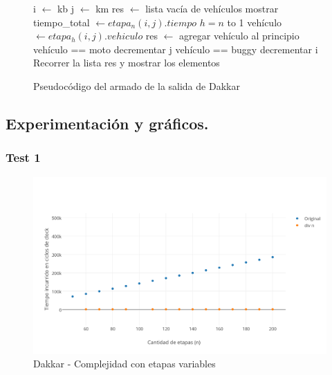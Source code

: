 \begin{figure}[!ht]
\begin{codebox}
\li i $\leftarrow$ kb
\li j $\leftarrow$ km
\li res $\leftarrow$ lista vacía de vehículos
\li mostrar tiempo_total $\leftarrow etapa_n(i,j).tiempo$
\li \For $h = n$ to 1
\li 		\Do 
			vehículo $\leftarrow etapa_h(i,j).vehiculo$
\li			res $\leftarrow$ agregar vehículo al principio
\li			\If vehículo == moto
\li				\Do decrementar j
\li 			\Else \If vehículo == buggy
\li					\Do decrementar i
					\End
			\End
		\End
\li Recorrer la lista res y mostrar los elementos
\end{codebox} 
\caption{Pseudocódigo del armado de la salida de Dakkar}\label{code:dakkar.salida}
\end{figure}

\vspace*{0.6cm}
\subsection{Experimentación y gráficos.}

\vspace*{0.3cm}

\subsubsection{Test 1}

\begin{figure}[htb]
	\begin{center}
    		\includegraphics[scale=0.5]{imagenes/1A.png}
	\end{center}
	\caption{Dakkar - Complejidad con etapas variables}\label{fig:1A}
\end{figure}

